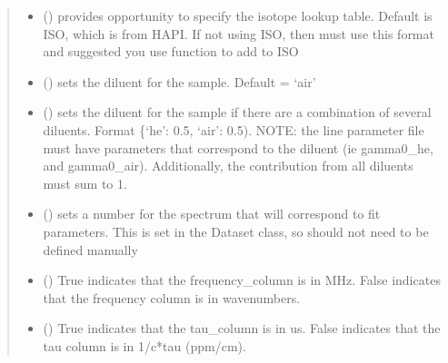 \documentclass[letterpaper,10pt,english]{sphinxmanual}
\begin{document}
\begin{fulllineitems}
\begin{quote}
\begin{description}
\begin{itemize}
\item {} 
\sphinxAtStartPar
{} (\sphinxstyleliteralemphasis{\sphinxupquote{, }}) \textendash{} provides opportunity to specify the isotope look\sphinxhyphen{}up table.  Default is ISO, which is from HAPI.  If not using ISO, then must use this format and suggested you use function to add to ISO

\item {} 
\sphinxAtStartPar
{} (\sphinxstyleliteralemphasis{\sphinxupquote{, }}) \textendash{} sets the diluent for the sample.  Default = ‘air’

\item {} 
\sphinxAtStartPar
{} (\sphinxstyleliteralemphasis{\sphinxupquote{, }}) \textendash{} sets the diluent for the sample if there are a combination of several diluents. Format \{‘he’: 0.5, ‘air’: 0.5). NOTE: the line parameter file must have parameters that correspond to the diluent (ie gamma0\_he, and gamma0\_air). Additionally, the contribution from all diluents must sum to 1.

\item {} 
\sphinxAtStartPar
{} (\sphinxstyleliteralemphasis{\sphinxupquote{, }}) \textendash{} sets a number for the spectrum that will correspond to fit parameters. This is set in the Dataset class, so should not need to be defined manually

\item {} 
\sphinxAtStartPar
{} (\sphinxstyleliteralemphasis{\sphinxupquote{, }}) \textendash{} True indicates that the frequency\_column is in MHz. False indicates that the frequency column is in wavenumbers.

\item {} 
\sphinxAtStartPar
{} (\sphinxstyleliteralemphasis{\sphinxupquote{, }}) \textendash{} True indicates that the tau\_column is in us. False indicates that the tau column is in 1/c*tau (ppm/cm).


\end{itemize}
\end{description}
\end{quote}
\end{fulllineitems}
\end{document}
